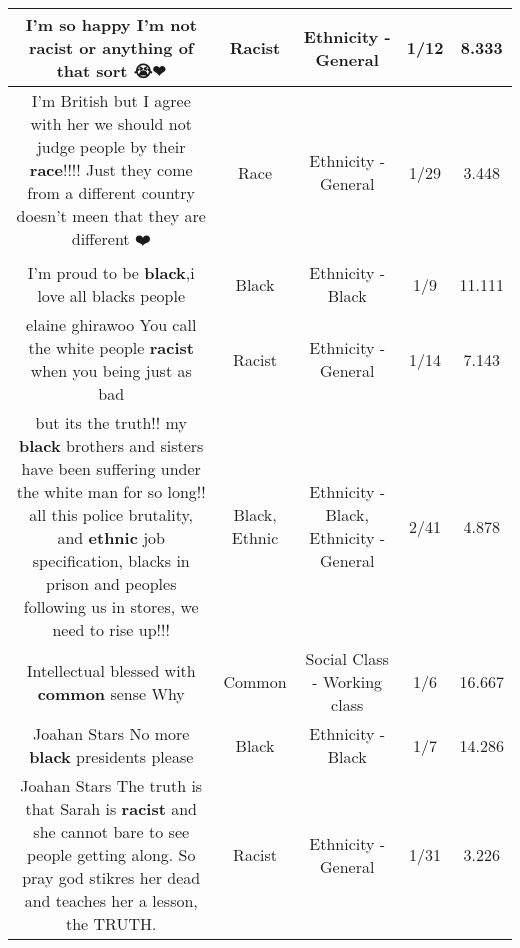 \documentclass[11pt]{article}
\newlength\mylength
\begin{document}
\begin{center}
\begin{longtable}{|C{.65\mylength}|C{.30\mylength}|C{.12\mylength}|C{.12\mylength}|C{.12\mylength}|}
  \small I'm so happy I'm not \textbf{racist} or anything of that sort 😭❤\normalsize   & Racist & Ethnicity - General & 1/12 & 8.333 \\  \hline
  \small I'm British but I agree with her we should not judge people by their \textbf{race}!!!!  Just they come from a different country doesn't meen that they are different ❤️\normalsize   & Race & Ethnicity - General & 1/29 & 3.448 \\  \hline
  \small I'm proud to be \textbf{black},i love all blacks people\normalsize   & Black & Ethnicity - Black & 1/9 & 11.111 \\  \hline
  \small elaine ghirawoo You call the white people \textbf{racist} when you being just as bad\normalsize   & Racist & Ethnicity - General & 1/14 & 7.143 \\  \hline
  \small but its the truth!! my \textbf{black} brothers and sisters have been suffering under the white man for so long!! all this police brutality, and \textbf{ethnic} job specification, blacks in prison and peoples following us in stores, we need to rise up!!!\normalsize   & Black, Ethnic & Ethnicity - Black, Ethnicity - General & 2/41 & 4.878 \\  \hline
  \small Intellectual blessed with \textbf{common} sense Why\normalsize   & Common & Social Class - Working class & 1/6 & 16.667 \\  \hline
  \small Joahan Stars  No more \textbf{black} presidents please\normalsize   & Black & Ethnicity - Black & 1/7 & 14.286 \\  \hline
  \small Joahan Stars The truth is that Sarah is \textbf{racist} and she cannot bare to see people getting along. So pray god stikres her dead and teaches her a lesson, the TRUTH.\normalsize   & Racist & Ethnicity - General & 1/31 & 3.226 \\  \hline

\end{longtable}
\end{center}
\end{document}
